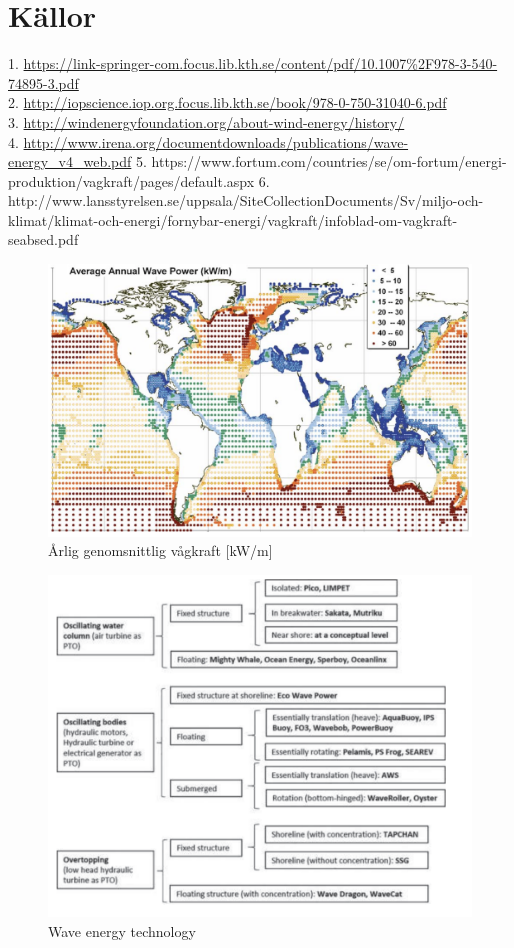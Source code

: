 \documentclass[10pt,a4paper,oneside]{article}
\begin{document}
\section{Källor}
1. \url{https://link-springer-com.focus.lib.kth.se/content/pdf/10.1007%2F978-3-540-74895-3.pdf} \\
2. \url{http://iopscience.iop.org.focus.lib.kth.se/book/978-0-750-31040-6.pdf} \\
3. \url{http://windenergyfoundation.org/about-wind-energy/history/} \\
4. \url{http://www.irena.org/documentdownloads/publications/wave-energy_v4_web.pdf}
5. https://www.fortum.com/countries/se/om-fortum/energi-produktion/vagkraft/pages/default.aspx
6. http://www.lansstyrelsen.se/uppsala/SiteCollectionDocuments/Sv/miljo-och-klimat/klimat-och-energi/fornybar-energi/vagkraft/infoblad-om-vagkraft-seabsed.pdf




\begin{figure}
\label{Globalmean}
	\includegraphics[scale=0.6]{globalmean.png}
	\caption{\r{A}rlig genomsnittlig v\r{a}gkraft [kW/m]}
\end{figure}

\begin{figure}
\label{Technologies}
	\includegraphics[scale=0.6]{Technologies.png}
	\caption{Wave energy technology}
\end{figure}
\end{document}
